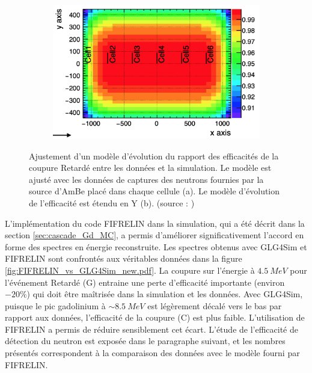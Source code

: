 {\begin{figure}[h!]
\begin{subfigure}[b]{0.49\textwidth}
\end{subfigure}
~ %
\begin{subfigure}[b]{0.49\textwidth}

\centering
\includegraphics[width=1\linewidth]{images/f_xy_Gd_fraction.png}
\caption{}
\label{fig:f_xy_Gd_fraction.png}

\end{subfigure}
\caption[Ajustement d'un modèle d'évolution du rapport des efficacités de la coupure Retardé entre les données et la simulation]{Ajustement d'un modèle d'évolution du rapport des efficacités de la coupure Retardé entre les données et la simulation. Le modèle est ajusté avec les données de captures des neutrons fournies par la source d'AmBe placé dans chaque cellule (a). Le modèle d'évolution de l'efficacité est étendu en Y (b). (source : \cite{docdb861})}
\label{fig:model_2D_capture_n}
\end{figure}

\clearpage


}

L'implémentation du code FIFRELIN dans la simulation, qui a été décrit dans la section \ref{sec:cascade_Gd_MC}, a permis d'améliorer significativement l'accord en forme des spectres en énergie reconstruite. Les spectres obtenus avec GLG4Sim et FIFRELIN sont confrontés aux véritables données dans la figure \ref{fig:FIFRELIN_vs_GLG4Sim_new.pdf}. La coupure sur l'énergie à $\SI{4.5}{MeV}$ pour l'événement Retardé (G) entraine une perte d'efficacité importante (environ $-20 \%$) qui doit être maîtrisée dans la simulation et les données. Avec GLG4Sim, puisque le pic gadolinium à $\sim \SI{8.5}{MeV}$ est légèrement décalé vers le bas par rapport aux données, l'efficacité de la coupure (C) est plus faible. L'utilisation de FIFRELIN a permis de réduire sensiblement cet écart. L'étude de l'efficacité de détection du neutron est exposée dans le paragraphe suivant, et les nombres présentés correspondent à la comparaison des données avec le modèle fourni par FIFRELIN.\\

